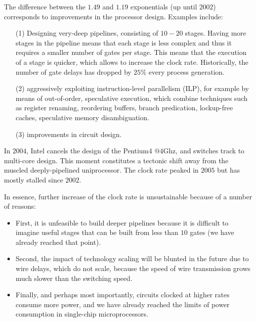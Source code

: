 \documentclass[acmsmall,review]{acmart}\settopmatter{printfolios=true,printccs=false,printacmref=false}
\begin{document}
The difference between the $1.49$ and $1.19$ exponentials
(up until $2002$) corresponds to improvements in the processor
design. Examples include:
\begin{itemize}
    \item[(1)] Designing very-deep pipelines, consisting of $10-20$ stages.
            Having more stages in the pipeline means that each stage
            is less complex and thus it requires a smaller number of gates 
            per stage. 
            This means that the execution of a stage is quicker, which allows 
            to increase the clock rate. Historically, the number of
            gate delays has dropped by $25\%$ every process generation. 

    \item[(2)] aggressively exploiting instruction-level parallelism (ILP), 
            for example by means of out-of-order, speculative execution, 
            which combine techniques such as register renaming, reordering
            buffers, branch predication, lockup-free caches, speculative 
            memory disambiguation.

    \item[(3)] improvements in circuit design.
\end{itemize}

In $2004$, Intel cancels the design of the Pentium4 $@4$Ghz, and
switches track to multi-core design. This moment constitutes a 
tectonic shift away from the muscled deeply-pipelined uniprocessor.
The clock rate peaked in $2005$ but has mostly stalled since $2002$.

In essence, further increase of the clock rate is unsustainable 
because of a number of reasons: 
\begin{itemize}
\item First, it is unfeasible to build deeper pipelines because it is
difficult to imagine useful stages that can be built from less than
$10$ gates (we have already reached that point).

\item Second, the impact of technology scaling will be blunted in the
future due to wire delays, which do not scale, because the speed 
of wire transmission grows much slower than the switching speed.

\item Finally, and perhaps most importantly, circuits clocked at higher 
rates consume more power, and we have already reached the limits of
power consumption in single-chip microprocessors.
\end{itemize}
\end{document}
